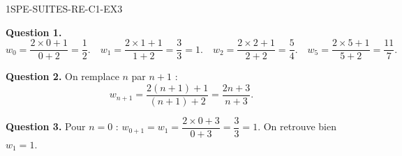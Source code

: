 \begin{corrige}{1SPE-SUITES-RE-C1-EX3}

\textbf{Question 1.}
\[
w_0 = \frac{2 \times 0 + 1}{0 + 2} = \frac{1}{2}. \quad
w_1 = \frac{2 \times 1 + 1}{1 + 2} = \frac{3}{3} = 1. \quad
w_2 = \frac{2 \times 2 + 1}{2 + 2} = \frac{5}{4}. \quad
w_5 = \frac{2 \times 5 + 1}{5 + 2} = \frac{11}{7}.
\]

\textbf{Question 2.} On remplace $n$ par $n+1$ :
\[
w_{n+1} = \frac{2(n+1)+1}{(n+1)+2} = \frac{2n+3}{n+3}.
\]

\textbf{Question 3.} Pour $n = 0$ : $w_{0+1} = w_1 = \dfrac{2 \times 0 + 3}{0 + 3} = \dfrac{3}{3} = 1$. On retrouve bien $w_1 = 1$. \checkmark

\end{corrige}
